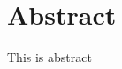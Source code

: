 \documentclass[main.tex]{subfiles}
\begin{document}
\chapter*{Abstract}
This is abstract
\end{document}
